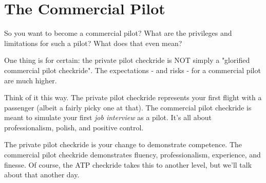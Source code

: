 \chapter{The Commercial Pilot}

So you want to become a commercial pilot? What are the privileges and limitations for such a pilot? What does that even mean?

One thing is for certain: the private pilot checkride is NOT simply a "glorified commercial pilot checkride". The expectations - and risks - for a commercial pilot are much higher.

Think of it this way. The private pilot checkride represents your first flight with a passenger (albeit a fairly picky one at that). The commercial pilot checkride is meant to simulate your first \emph{job interview} as a pilot. It's all about professionalism, polish, and positive control.

The private pilot checkride is your change to demonstrate competence. The commercial pilot checkride demonstrates fluency, professionalism, experience, and finesse. Of course, the ATP checkride takes this to another level, but we'll talk about that another day.

